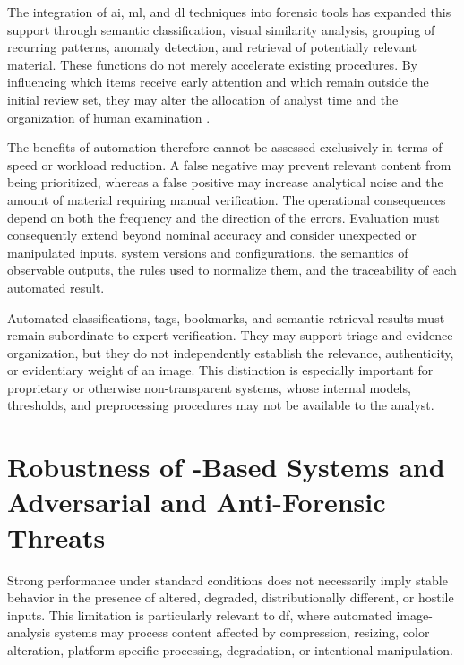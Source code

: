 The integration of \gls{ai}, \gls{ml}, and \gls{dl} techniques into forensic
tools has expanded this support through semantic classification, visual
similarity analysis, grouping of recurring patterns, anomaly detection, and
retrieval of potentially relevant material. These functions do not merely
accelerate existing procedures. By influencing which items receive early
attention and which remain outside the initial review set, they may alter the
allocation of analyst time and the organization of human examination
\cite{sanna2025cybercrime,sanna2025pixelperfect}.

The benefits of automation therefore cannot be assessed exclusively in terms of
speed or workload reduction. A false negative may prevent relevant content from
being prioritized, whereas a false positive may increase analytical noise and
the amount of material requiring manual verification. The operational
consequences depend on both the frequency and the direction of the errors.
Evaluation must consequently extend beyond nominal accuracy and consider
unexpected or manipulated inputs, system versions and configurations, the
semantics of observable outputs, the rules used to normalize them, and the
traceability of each automated result.

Automated classifications, tags, bookmarks, and semantic retrieval results must
remain subordinate to expert verification. They may support triage and evidence
organization, but they do not independently establish the relevance,
authenticity, or evidentiary weight of an image. This distinction is especially
important for proprietary or otherwise non-transparent systems, whose internal
models, thresholds, and preprocessing procedures may not be available to the
analyst.

\section[Robustness of AI-Based Systems and Adversarial and Anti-Forensic Threats]
{Robustness of -Based Systems and Adversarial and
Anti-Forensic Threats}

Strong performance under standard conditions does not necessarily imply stable
behavior in the presence of altered, degraded, distributionally different, or
hostile inputs. This limitation is particularly relevant to \gls{df}, where
automated image-analysis systems may process content affected by compression,
resizing, color alteration, platform-specific processing, degradation, or
intentional manipulation.

